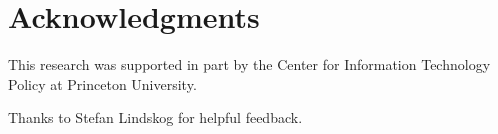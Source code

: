 \section*{Acknowledgments}
This research was supported in part by the Center for Information Technology
Policy at Princeton University.

Thanks to Stefan Lindskog for helpful feedback.
